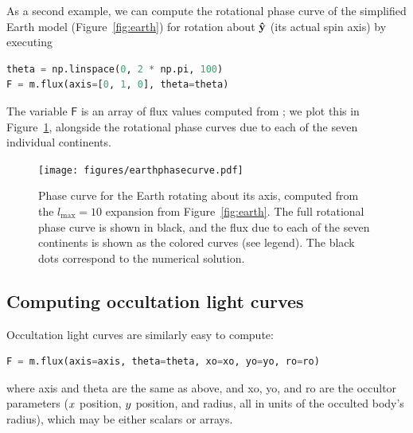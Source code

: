 \documentclass[modern]{aastex61}
\begin{document}
As a second example, we can compute the rotational phase curve of the simplified Earth model
(Figure~\ref{fig:earth}) for rotation about $\mathbf{\hat{y}}$ (its actual spin axis)
by executing
%
\begin{lstlisting}[language=Python,firstnumber=last]
theta = np.linspace(0, 2 * np.pi, 100)
F = m.flux(axis=[0, 1, 0], theta=theta)
\end{lstlisting}
%
The variable $\textsf{F}$ is
an array of flux values computed from ; we plot this in
Figure~\ref{fig:earthphasecurve}, alongside the rotational phase curves due to each of
the seven individual continents.
%
\begin{figure}[ht!]
    \begin{centering}
    \texttt{[image: figures/earthphasecurve.pdf]}
    \caption{\label{fig:earthphasecurve}
             Phase curve for the Earth rotating about its axis, computed
             from the $l_\mathrm{max} = 10$ expansion from
             Figure~\ref{fig:earth}. The full rotational phase curve is shown in black,
             and the flux due to each of the seven continents is shown as
             the colored curves (see legend). The black dots correspond to the
             numerical solution.}
    \end{centering}
\end{figure}
%

\subsection{Computing occultation light curves}
\label{sec:starryoccultation}

Occultation light curves are similarly easy to compute:
%
\begin{lstlisting}[language=Python,firstnumber=last]
F = m.flux(axis=axis, theta=theta, xo=xo, yo=yo, ro=ro)
\end{lstlisting}
%
where \textsf{axis} and \textsf{theta} are the same as above, and
\textsf{xo}, \textsf{yo}, and \textsf{ro} are the occultor parameters
($\mbox{$x$}$ position, $\mbox{$y$}$ position, and radius, all in units of the
occulted body's radius), which may be either scalars
or arrays.

%
\end{document}
